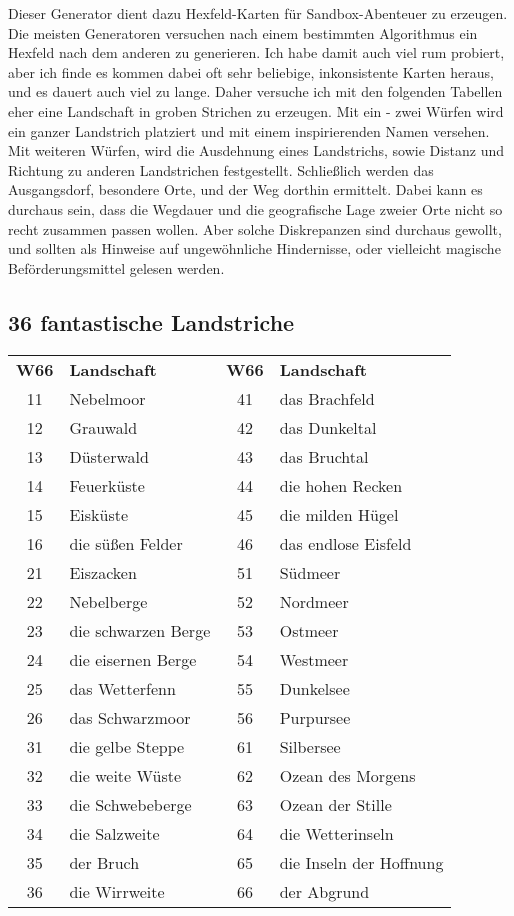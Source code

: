 \documentclass[11pt]{wbzine}
\begin{document}
Dieser Generator dient dazu Hexfeld-Karten für Sandbox-Abenteuer zu
erzeugen. Die meisten Generatoren versuchen nach einem bestimmten
Algorithmus ein Hexfeld nach dem anderen zu generieren. Ich habe
damit auch viel rum probiert, aber ich finde es kommen dabei oft
sehr beliebige, inkonsistente Karten heraus, und es dauert auch viel
zu lange. Daher versuche ich mit den folgenden Tabellen eher eine
Landschaft in groben Strichen zu erzeugen. Mit ein - zwei Würfen
wird ein ganzer Landstrich platziert und mit einem inspirierenden
Namen versehen. Mit weiteren Würfen, wird die Ausdehnung eines
Landstrichs, sowie Distanz und Richtung zu anderen Landstrichen
festgestellt. Schließlich werden das Ausgangsdorf, besondere Orte,
und der Weg dorthin ermittelt. Dabei kann es durchaus sein, dass die
Wegdauer und die geografische Lage zweier Orte nicht so recht
zusammen passen wollen. Aber solche Diskrepanzen sind durchaus
gewollt, und sollten als Hinweise auf ungewöhnliche Hindernisse,
oder vielleicht magische Beförderungsmittel gelesen werden.

\subsection{36 fantastische Landstriche}
\begin{tabularx}{\columnwidth}{cZcZ}
\textbf{W66} & \textbf{Landschaft} & \textbf{W66} &
\textbf{Landschaft} \\ 
11 & Nebelmoor & 41 & das Brachfeld\\
12 & Grauwald & 42 & das Dunkeltal\\
13 & Düsterwald & 43 & das Bruchtal\\
14 & Feuerküste & 44 & die hohen Recken\\
15 & Eisküste & 45 & die milden Hügel\\
16 & die süßen Felder & 46 & das endlose Eisfeld\\
21 & Eiszacken & 51 & Südmeer\\
22 & Nebelberge & 52 & Nordmeer\\
23 & die schwarzen Berge & 53 & Ostmeer\\
24 & die eisernen Berge & 54 & Westmeer\\
25 & das Wetterfenn & 55 & Dunkelsee\\
26 & das Schwarzmoor & 56 & Purpursee\\
31 & die gelbe Steppe & 61 & Silbersee\\
32 & die weite Wüste & 62 & Ozean des Morgens\\
33 & die Schwebeberge & 63 & Ozean der Stille\\
34 & die Salzweite & 64 & die Wetterinseln\\
35 & der Bruch & 65 & die Inseln der Hoffnung\\
36 & die Wirrweite & 66 & der Abgrund\\
\end{tabularx}
\end{document}
